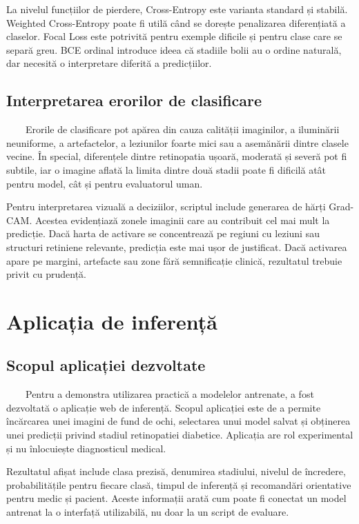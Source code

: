 \documentclass[12pt, a4paper, oneside, romanian]{teza-upb}
\begin{document}
La nivelul funcțiilor de pierdere, Cross-Entropy este varianta standard și stabilă. Weighted Cross-Entropy poate fi utilă când se dorește penalizarea diferențiată a claselor. Focal Loss este potrivită pentru exemple dificile și pentru clase care se separă greu. BCE ordinal introduce ideea că stadiile bolii au o ordine naturală, dar necesită o interpretare diferită a predicțiilor.

\section{Interpretarea erorilor de clasificare}

\ \ \ \ Erorile de clasificare pot apărea din cauza calității imaginilor, a iluminării neuniforme, a artefactelor, a leziunilor foarte mici sau a asemănării dintre clasele vecine. În special, diferențele dintre retinopatia ușoară, moderată și severă pot fi subtile, iar o imagine aflată la limita dintre două stadii poate fi dificilă atât pentru model, cât și pentru evaluatorul uman.
\bigskip

Pentru interpretarea vizuală a deciziilor, scriptul include generarea de hărți Grad-CAM. Acestea evidențiază zonele imaginii care au contribuit cel mai mult la predicție. Dacă harta de activare se concentrează pe regiuni cu leziuni sau structuri retiniene relevante, predicția este mai ușor de justificat. Dacă activarea apare pe margini, artefacte sau zone fără semnificație clinică, rezultatul trebuie privit cu prudență.


\chapter{Aplicația de inferență}

\section{Scopul aplicației dezvoltate}

\ \ \ \ Pentru a demonstra utilizarea practică a modelelor antrenate, a fost dezvoltată o aplicație web de inferență. Scopul aplicației este de a permite încărcarea unei imagini de fund de ochi, selectarea unui model salvat și obținerea unei predicții privind stadiul retinopatiei diabetice. Aplicația are rol experimental și nu înlocuiește diagnosticul medical.
\bigskip

Rezultatul afișat include clasa prezisă, denumirea stadiului, nivelul de încredere, probabilitățile pentru fiecare clasă, timpul de inferență și recomandări orientative pentru medic și pacient. Aceste informații arată cum poate fi conectat un model antrenat la o interfață utilizabilă, nu doar la un script de evaluare.
\end{document}

